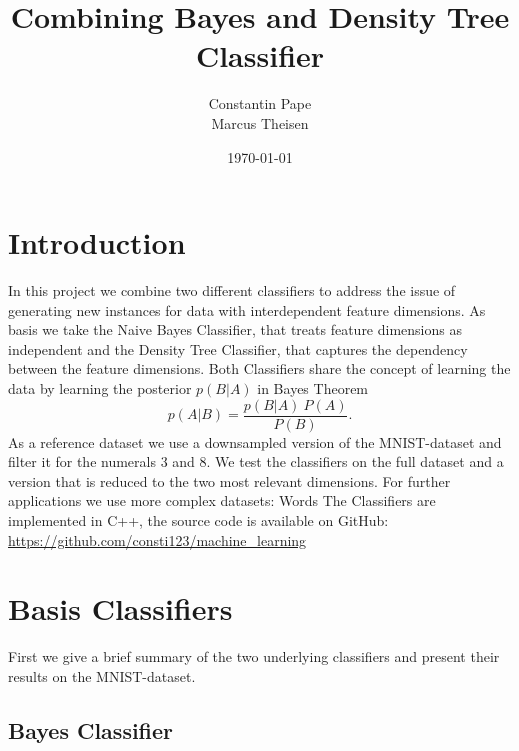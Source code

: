 \documentclass{article}
\title{Combining Bayes and Density Tree Classifier}
\author{Constantin Pape\\
        Marcus Theisen}
\date{\today}
\begin{document}
\maketitle

\section{Introduction}

In this project we combine two different classifiers to address the issue of generating new instances for data with interdependent feature dimensions. As basis we take the Naive Bayes Classifier, that treats feature dimensions as independent and the Density Tree Classifier, that captures the dependency between the feature dimensions. 
\newline
Both Classifiers share the concept of learning the data by learning the posterior $p(B|A)$ in Bayes Theorem 
\begin{equation} \label{eq1}
	p(A|B) = \frac{p(B|A) ~ P(A)}{P(B)} .
\end{equation}
As a reference dataset we use a downsampled version of the MNIST-dataset and filter it for the numerals 3 and 8. We test the classifiers on the full dataset and a version that is reduced to the two most relevant dimensions.
For further applications we use more complex datasets: Words %
\newline
The Classifiers are implemented in C++, the source code is available on GitHub: \newline
\url{https://github.com/consti123/machine_learning}

\section{Basis Classifiers}

First we give a brief summary of the two underlying classifiers and present their results on the MNIST-dataset.

\subsection{Bayes Classifier}
\end{document}
